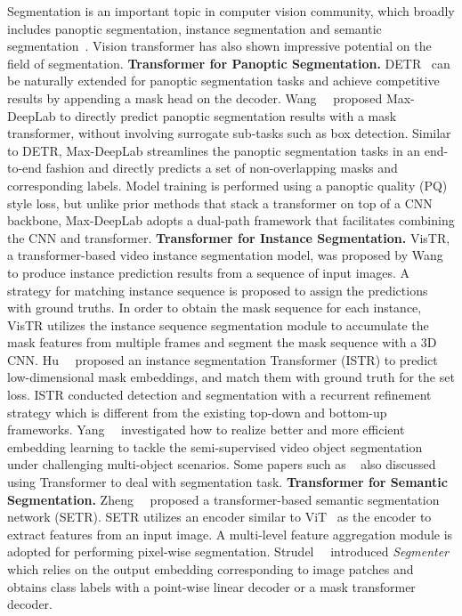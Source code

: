 Segmentation is an important topic in computer vision community, which broadly includes panoptic segmentation, instance segmentation and semantic segmentation~\etc. Vision transformer has also shown impressive potential on the field of segmentation.
\noindent\textbf{Transformer for Panoptic Segmentation.} 
DETR~ can be naturally extended for panoptic segmentation tasks and achieve competitive results by appending a mask head on the decoder. Wang~\etal~ proposed Max-DeepLab to directly predict panoptic segmentation results with a mask transformer, without involving surrogate sub-tasks such as box detection. Similar to DETR, Max-DeepLab streamlines the panoptic segmentation tasks in an end-to-end fashion and directly predicts a set of non-overlapping masks and corresponding labels. Model training is performed using a panoptic quality (PQ) style loss, but unlike prior methods that stack a transformer on top of a CNN backbone, Max-DeepLab adopts a dual-path framework that facilitates combining the CNN and transformer.
\noindent\textbf{Transformer for Instance Segmentation.}
VisTR, a transformer-based video instance segmentation model, was proposed by Wang~\etal~ to produce instance prediction results from a sequence of input images. A strategy for matching instance sequence is proposed to assign the predictions with ground truths. In order to obtain the mask sequence for each instance, VisTR utilizes the instance sequence segmentation module to accumulate the mask features from multiple frames and segment the mask sequence with a 3D CNN.
Hu~\etal~ proposed an instance segmentation Transformer (ISTR) to predict low-dimensional mask embeddings, and match them with ground truth for the set loss. ISTR conducted detection and segmentation with a recurrent refinement strategy which is different from the existing top-down and bottom-up frameworks.
Yang~\etal~ investigated how to realize better and more efficient embedding learning to tackle the semi-supervised video object segmentation under challenging multi-object scenarios.
Some papers such as ~ also discussed using Transformer to deal with segmentation task.
\noindent\textbf{Transformer for Semantic Segmentation.}
Zheng~\etal~ proposed a transformer-based semantic segmentation network (SETR). SETR utilizes an encoder similar to ViT~ as the encoder to extract features from an input image. A multi-level feature aggregation module is adopted for performing pixel-wise segmentation.
Strudel~\etal~ introduced \textit{Segmenter} which relies on the output embedding corresponding to image patches and obtains class labels with a point-wise linear decoder or a mask transformer decoder.
